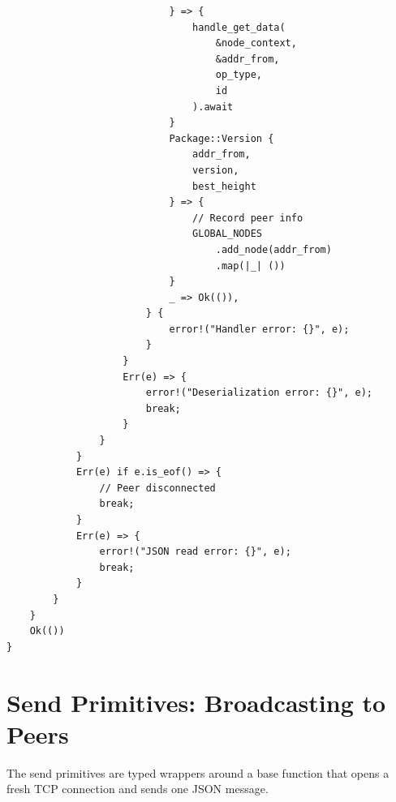 \begin{listing}[htbp]
\begin{verbatim}
                            } => {
                                handle_get_data(
                                    &node_context,
                                    &addr_from,
                                    op_type,
                                    id
                                ).await
                            }
                            Package::Version {
                                addr_from,
                                version,
                                best_height
                            } => {
                                // Record peer info
                                GLOBAL_NODES
                                    .add_node(addr_from)
                                    .map(|_| ())
                            }
                            _ => Ok(()),
                        } {
                            error!("Handler error: {}", e);
                        }
                    }
                    Err(e) => {
                        error!("Deserialization error: {}", e);
                        break;
                    }
                }
            }
            Err(e) if e.is_eof() => {
                // Peer disconnected
                break;
            }
            Err(e) => {
                error!("JSON read error: {}", e);
                break;
            }
        }
    }
    Ok(())
}
\end{verbatim}
\end{listing}

\section{Send Primitives: Broadcasting to Peers}
\label{sec:ch12-send-primitives}

The send primitives are typed wrappers around a base  function that opens a fresh TCP connection and sends one JSON message.

